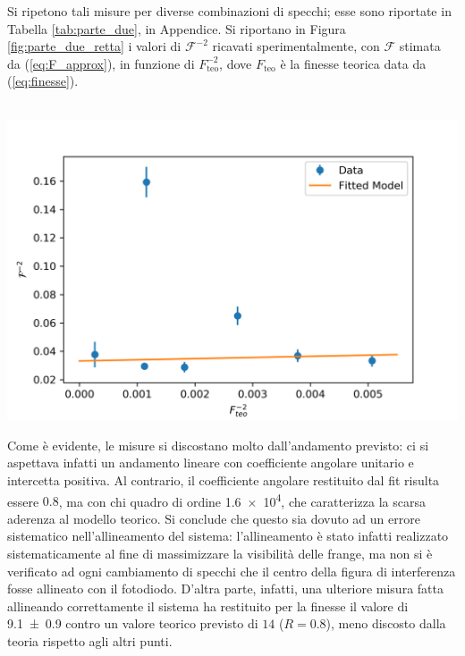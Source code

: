 \documentclass[10pt,oneside,a4paper]{article}
\newenvironment{Figure}
  {\par\medskip\noindent\minipage{\linewidth}}
  {\endminipage\par\medskip}
\begin{document}
\begin{multicols}{2}
Si ripetono tali misure per diverse combinazioni di specchi; esse sono riportate in Tabella \ref{tab:parte_due}, in Appendice. Si riportano in Figura \ref{fig:parte_due_retta} i valori di $\mathcal{F}^{-2}$ ricavati sperimentalmente, con $\mathcal{F}$ stimata da (\ref{eq:F_approx}), in funzione di $F_\mathrm{teo}^{-2}$, dove $F_\mathrm{teo}$ è la finesse teorica data da (\ref{eq:finesse}).
\begin{Figure}
	\begin{center}
	\hbox{\hspace{-0.8cm}
	\includegraphics[width=1.1\linewidth]{parte_due_fit.png}}
	\label{fig:parte_due_retta}
	\end{center}
\end{Figure}

Come è evidente, le misure si discostano molto dall'andamento previsto: ci si aspettava infatti un andamento lineare con coefficiente angolare unitario e intercetta positiva. Al contrario, il coefficiente angolare restituito dal fit risulta essere $0.8$, ma con chi quadro di ordine \SI{1.6 e4}{}, che caratterizza la scarsa aderenza al modello teorico. Si conclude che questo sia dovuto ad un errore sistematico nell'allineamento del sistema: l'allineamento è stato infatti realizzato sistematicamente al fine di massimizzare la visibilità delle frange, ma non si è verificato ad ogni cambiamento di specchi che il centro della figura di interferenza fosse allineato con il fotodiodo. D'altra parte, infatti, una ulteriore misura fatta allineando correttamente il sistema ha restituito per la finesse il valore di \SI{9.1 \pm 0.9}{} contro un valore teorico previsto di $14$ ($R=0.8$), meno discosto dalla teoria rispetto agli altri punti.


\end{multicols}
\end{document}
